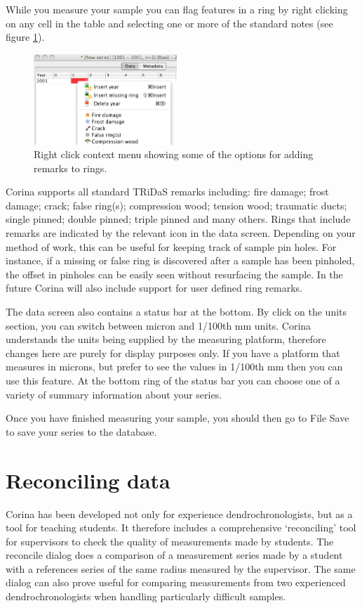 While you measure your sample you can flag features in a ring by right clicking on any cell in the table and selecting one or more of the standard notes (see figure \ref{fig:ringremarks}).  

\begin{figure}
  \begin{center}
    \includegraphics[width=0.48\textwidth]{Images/ringremarks.png}
  \end{center}
  \caption{Right click context menu showing some of the options for adding remarks to rings.}
  \label{fig:ringremarks}
\end{figure}

Corina supports all standard TRiDaS remarks including: fire damage; frost damage; crack; false ring(s); compression wood; tension wood; traumatic ducts; single pinned; double pinned; triple pinned and many others.  Rings that include remarks are indicated by the relevant icon in the data screen.  Depending on your method of work, this can be useful for keeping track of sample pin holes.  For instance, if a missing or false ring is discovered after a sample has been pinholed, the offset in pinholes can be easily seen without resurfacing the sample.  In the future Corina will also include support for user defined ring remarks.  

The data screen also contains a status bar at the bottom. By click on the units section, you can switch between micron and 1/100th mm units. Corina understands the units being supplied by the measuring platform, therefore changes here are purely for display purposes only. If you have a platform that measures in microns, but prefer to see the values in 1/100th mm then you can use this feature. At the bottom ring of the status bar you can choose one of a variety of summary information about your series.

Once you have finished measuring your sample, you should then go to File \MVRightarrow Save to save your series to the database. 

\section{Reconciling data}
Corina has been developed not only for experience dendrochronologists, but as a tool for teaching students.  It therefore includes a comprehensive `reconciling' tool for supervisors to check the quality of measurements made by students.  The reconcile dialog does a comparison of a measurement series made by a student with a references series of the same radius measured by the supervisor.  The same dialog can also prove useful for comparing measurements from two experienced dendrochronologists when handling particularly difficult samples.

 


